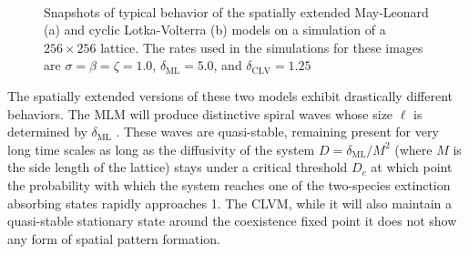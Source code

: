 \documentclass[12pt]{article}
\begin{document}
\begin{figure}[h]
    \begin{center}
    \\
    \caption{Snapshots of typical behavior of the spatially extended May-Leonard (a) and cyclic Lotka-Volterra (b) models on
        a simulation of a $ 256\times 256 $ lattice. The rates used in the simulations for these images are $ \sigma = \beta = \zeta =1.0 $, $ \delta_{\mathrm{ML}} = 5.0$, and $ \delta_{\mathrm{CLV}} = 1.25 $    }
\label{fig:stab}
    \end{center} 
\end{figure}

The spatially extended versions of these two models exhibit drastically different behaviors. The MLM will produce distinctive spiral
waves whose size $ \ell $  is determined by $ \delta_{\mathrm{ML}} $ \cite{HeMobiliaTauber}. These waves are quasi-stable, remaining
present for very long time scales as long as the diffusivity of the system $ D = \delta_{\mathrm{ML}}/M^2 $ (where $ M $ is the
side length of the lattice) stays under a critical threshold $ D_c $ at which point the probability with which the system reaches 
one of the two-species extinction absorbing states rapidly approaches 1. The CLVM, while it will also maintain a quasi-stable stationary state around the coexistence 
fixed point it does not show any form of spatial pattern formation\cite{dobromasyletal}.
\end{document}
